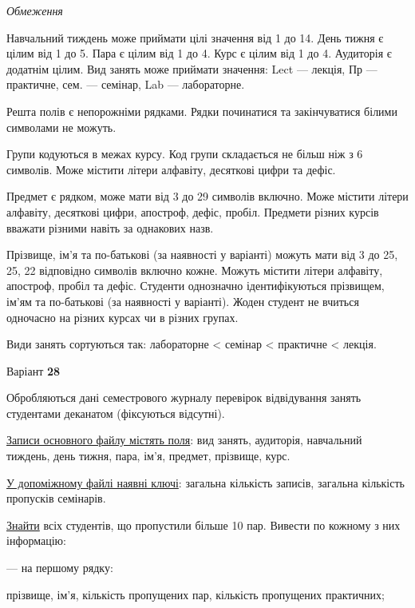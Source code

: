 \documentclass[11pt, ukrainian]{article}
\begin{document}

\bigskip\textit{Обмеження}

Навчальний тиждень може приймати цілі значення від 1 до 14.
День тижня є цілим від 1 до 5. Пара є цілим від 1 до 4.
Курс є цілим від 1 до 4. Аудиторія є додатнім цілим.
Вид занять може приймати значення:
Lect --- лекція, Пр --- практичне, сем. --- семінар, Lab --- лабораторне.

Решта полів є непорожніми рядками.
Рядки починатися та закінчуватися білими символами не можуть.

Групи кодуються в межах курсу.
Код групи складається не більш ніж з 6 символів.
Може містити літери алфавіту, десяткові цифри та дефіс.

Предмет є рядком, може мати від 3 до 29 символів включно.
Може містити літери алфавіту, десяткові цифри, апостроф, дефіс, пробіл.
Предмети різних курсів вважати різними навіть за однакових назв.

Прізвище, ім’я та по-батькові (за наявності у варіанті)
можуть мати від 3 до 25, 25, 22 відповідно символів включно кожне.
Можуть містити літери алфавіту, апостроф, пробіл та дефіс.
Студенти однозначно ідентифікуються прізвищем, ім’ям та по-батькові (за наявності у варіанті).
Жоден студент не вчиться одночасно на різних курсах чи в різних групах.

Види занять сортуються так: лабораторне < семінар < практичне < лекція.



\par
\newpage
{\center Варіант  \No \textbf { 28 }\par}
\bigskip
Обробляються дані семестрового журналу перевірок відвідування занять студентами деканатом (фіксуються відсутні). 

\underline{Записи основного файлу містять поля}: вид занять, аудиторія, навчальний тиждень, день тижня, пара, ім’я, предмет, прізвище, курс.

\underline{У допоміжному файлі наявні ключі}: загальна кількість записів, загальна кількість пропусків семінарів.

\underline{Знайти} всіх студентів, що пропустили більше 10 пар. Вивести по кожному з них інформацію:\par
{\noindent}--- на першому рядку:\par
прізвище, ім’я, кількість пропущених пар, кількість пропущених практичних;
\end{document}
